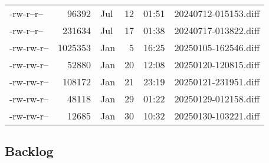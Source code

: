 \documentclass[a4paper]{article}
\begin{document}
\begin{longtable}{lrlrrl}
-rw-r--r-- & 96392 & Jul & 12 & 01:51 & 20240712-015153.diff\\[0pt]
-rw-r--r-- & 231634 & Jul & 17 & 01:38 & 20240717-013822.diff\\[0pt]
-rw-rw-r-- & 1025353 & Jan & 5 & 16:25 & 20250105-162546.diff\\[0pt]
-rw-rw-r-- & 52880 & Jan & 20 & 12:08 & 20250120-120815.diff\\[0pt]
-rw-rw-r-- & 108172 & Jan & 21 & 23:19 & 20250121-231951.diff\\[0pt]
-rw-rw-r-- & 48118 & Jan & 29 & 01:22 & 20250129-012158.diff\\[0pt]
-rw-rw-r-- & 12685 & Jan & 30 & 10:32 & 20250130-103221.diff\\[0pt]
\end{longtable}
\rmfamily

\subsection{Backlog}
\label{sec:org41d6ccf}
\end{document}
